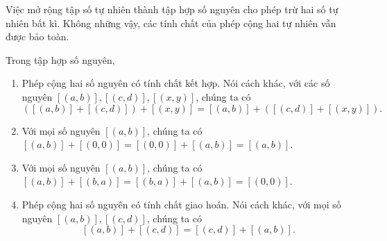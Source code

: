 Việc mở rộng tập số tự nhiên thành tập hợp số nguyên cho phép trừ hai số tự nhiên bất kì. Không những vậy, các tính chất của phép cộng hai tự nhiên vẫn được bảo toàn.
\begin{theorem}\label{theorem:group-of-integers}
    Trong tập hợp số nguyên,
    \begin{enumerate}[label={(\roman*)}]
        \item Phép cộng hai số nguyên có tính chất kết hợp. Nói cách khác, với các số nguyên $[(a, b)], [(c, d)], [(x, y)]$, chúng ta có
              \[
                  ([(a, b)] + [(c, d)]) + [(x, y)] = [(a, b)] + ([(c, d)] + [(x, y)]).
              \]
        \item Với mọi số nguyên $[(a, b)]$, chúng ta có $[(a, b)] + [(0, 0)] = [(0, 0)] + [(a, b)] = [(a, b)]$.
        \item Với mọi số nguyên $[(a, b)]$, chúng ta có $[(a, b)] + [(b, a)] = [(b, a)] + [(a, b)] = [(0, 0)]$.
        \item Phép cộng hai số nguyên có tính chất giao hoán. Nói cách khác, với mọi số nguyên $[(a, b)], [(c, d)]$, chúng ta có
              \[
                  [(a, b)] + [(c, d)] = [(c, d)] + [(a, b)].
              \]
    \end{enumerate}
\end{theorem}

